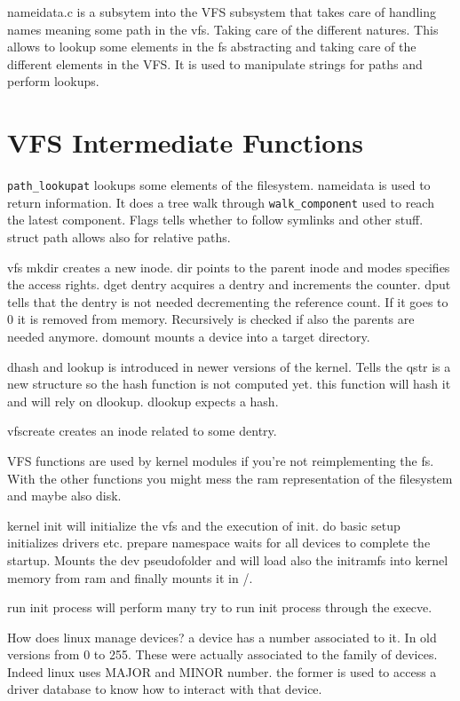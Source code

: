 \documentclass[twoside]{article}
\begin{document}
nameidata.c is a subsytem into the VFS subsystem that takes care of handling
names meaning some path in the vfs. Taking care of the different natures. This
allows to lookup some elements in the fs abstracting and taking care of the
different elements in the VFS. It is used to manipulate strings for paths and
perform lookups.

\section{VFS Intermediate Functions}
\label{sec:VFS Intermediate Functions}

\texttt{path_lookupat} lookups some elements of the filesystem. nameidata is
used to return information. It does a tree walk through \texttt{walk_component}
used to reach the latest component. Flags tells whether to follow symlinks and
other stuff. struct path allows also for relative paths.

vfs mkdir creates a new inode. dir points to the parent inode and modes
specifies the access rights. dget dentry acquires a dentry and increments the
counter. dput tells that the dentry is not needed decrementing the reference
count. If it goes to 0 it is removed from  memory. Recursively is checked if
also the parents are needed anymore. domount mounts a device into a target
directory.

dhash and lookup is introduced in newer versions of the kernel. Tells the qstr
is a new structure so the hash function is not computed yet. this function will
hash it and will rely on dlookup. dlookup expects a hash.

vfscreate creates an inode related to some dentry.

VFS functions are used by kernel modules if you're not reimplementing the fs.
With the other functions you might mess the ram representation of the filesystem
and maybe also disk.

kernel init will initialize the vfs and the execution of init. do basic setup
initializes drivers etc. prepare namespace waits for all devices to complete the
startup. Mounts the dev pseudofolder and will load also the initramfs into
kernel memory from ram and finally mounts it in /.

run init process will perform many try to run init process through the execve.

How does linux manage devices? a device has a number associated to it. In old
versions from 0 to 255. These were actually associated to the family of devices.
Indeed linux uses MAJOR and MINOR number. the former is used to access a driver
database to know how to interact with that device.
\end{document}
